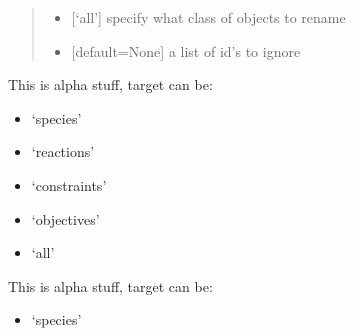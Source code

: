 \documentclass[letterpaper,12pt,english]{sphinxmanual}
\begin{document}
\begin{fulllineitems}
\begin{fulllineitems}
\begin{quote}
\begin{description}
\begin{itemize}
\item {} 
\sphinxAtStartPar
{} \textendash{} {[}‘all’{]} specify what class of objects to rename

\item {} 
\sphinxAtStartPar
{} \textendash{} {[}default=None{]} a list of id’s to ignore

\end{itemize}

\end{description}\end{quote}

\end{fulllineitems}


\begin{fulllineitems}
\label{\detokenize{api/core:cbmpy.CBModel.Model.setPrefix}}
\pysigstartsignatures
\pysiglinewithargsret
{}
{\sphinxparamcomma {}}
{}
\pysigstopsignatures
\sphinxAtStartPar
This is alpha stuff, target can be:
\begin{itemize}
\item {} 
\sphinxAtStartPar
‘species’

\item {} 
\sphinxAtStartPar
‘reactions’

\item {} 
\sphinxAtStartPar
‘constraints’

\item {} 
\sphinxAtStartPar
‘objectives’

\item {} 
\sphinxAtStartPar
‘all’

\end{itemize}

\end{fulllineitems}


\begin{fulllineitems}
\label{\detokenize{api/core:cbmpy.CBModel.Model.setSuffix}}
\pysigstartsignatures
\pysiglinewithargsret
{}
{\sphinxparamcomma {}}
{}
\pysigstopsignatures
\sphinxAtStartPar
This is alpha stuff, target can be:
\begin{itemize}
\item {} 
\sphinxAtStartPar
‘species’


\end{itemize}
\end{fulllineitems}
\end{fulllineitems}
\end{document}
